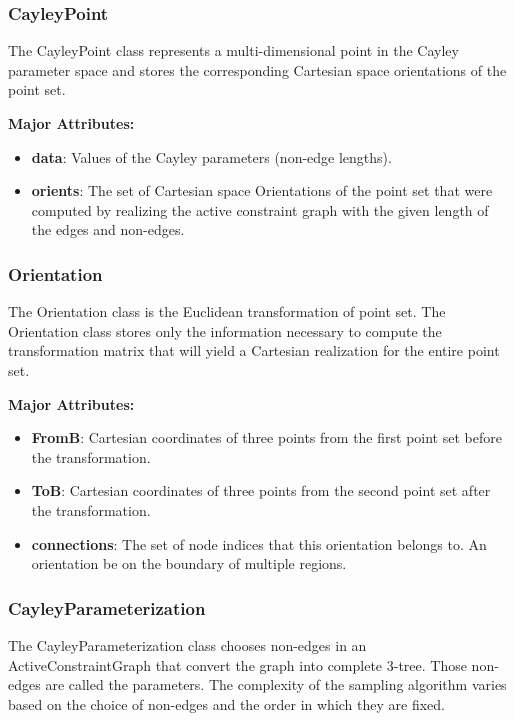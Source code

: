 \subsubsection{CayleyPoint} 
The CayleyPoint class represents a multi-dimensional point in the Cayley parameter space
and stores the corresponding Cartesian space orientations of the point set.

\noindent \textbf{Major Attributes:}
\begin{itemize}
		\item  \textbf{data}: Values of the Cayley parameters (non-edge
				lengths). \item  \textbf{orients}: The set of Cartesian space
				Orientations of the point set that were computed by
				realizing the active constraint graph with the given length of
				the edges and non-edges.
\end{itemize}

\subsubsection{Orientation} 
The Orientation class is the Euclidean transformation of point set. The
Orientation class stores only the information necessary to compute the
transformation matrix that will yield a Cartesian realization for the entire
point set.

\noindent \textbf{Major Attributes:} 
\begin{itemize}
		\item  \textbf{FromB}: Cartesian coordinates of three points from the
				first point set before the transformation.
		\item  \textbf{ToB}: Cartesian coordinates of three points from the
				second point set after the transformation.
		\item  \textbf{connections}: The set of node indices that this
				orientation belongs to. An orientation be on the
				boundary of multiple regions.
\end{itemize}


\subsubsection{CayleyParameterization} 
The CayleyParameterization class chooses non-edges in an ActiveConstraintGraph
that convert the graph into complete 3-tree. Those non-edges are called the
parameters. The complexity of the sampling algorithm varies based on the
choice of non-edges and the order in which they are fixed.

